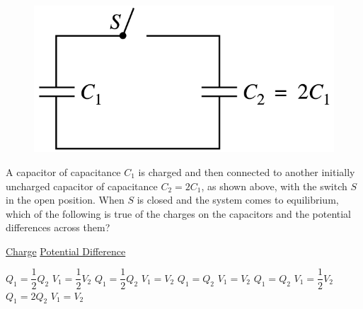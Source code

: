 \begin{figure}[H]
    \center
    \includegraphics[scale=0.25]{images/img-012-022.png}
\end{figure}

\begin{questions}\setcounter{question}{31}\question
A capacitor of capacitance $C_{1}$ is charged and then connected to another initially uncharged capacitor of capacitance $C_{2}=2 C_{1}$, as shown above, with the switch $S$ in the open position. When $S$ is closed and the system comes to equilibrium, which of the following is true of the charges on the capacitors and the potential differences across them?

\tabto{0.75cm}\underline{Charge}
\tabto{4.00cm}\underline{Potential Difference}

\begin{choices}
\choice $Q_{1} = \dfrac{1}{2} Q_{2}$ \tabto{3.25cm} $V_{1} = \dfrac{1}{2} V_{2}$
\choice $Q_{1} = \dfrac{1}{2} Q_{2}$ \tabto{3.25cm} $V_{1} = V_{2}$
\choice $Q_{1} = Q_{2}$              \tabto{3.25cm} $V_{1} = V_{2}$
\choice $Q_{1} = Q_{2}$              \tabto{3.25cm} $V_{1} = \dfrac{1}{2} V_{2}$
\choice $Q_{1} = 2 Q_{2}$            \tabto{3.25cm} $V_{1} = V_{2}$
\end{choices}\end{questions}

